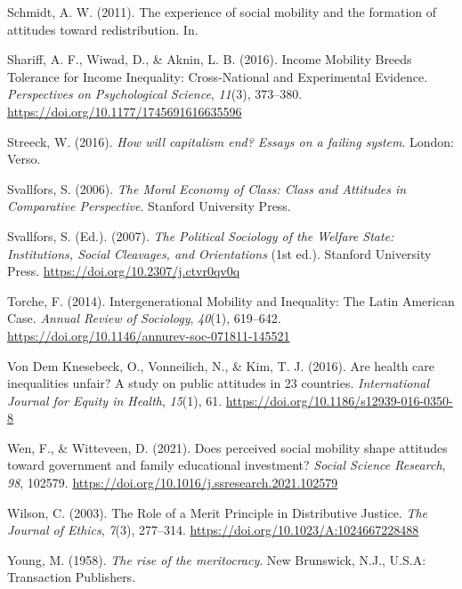 \documentclass[
  12pt,
]{article}
\newlength{\cslhangindent}
\newenvironment{CSLReferences}[2] %
 {\begin{list}{}{%
  \setlength{\itemindent}{0pt}
  \setlength{\leftmargin}{0pt}
  \setlength{\parsep}{0pt}
  \ifodd #1
   \setlength{\leftmargin}{\cslhangindent}
   \setlength{\itemindent}{-1\cslhangindent}
  \fi
  \setlength{\itemsep}{#2\baselineskip}}}
 {\end{list}}
\begin{document}
\begin{CSLReferences}{1}{0}
Schmidt, A. W. (2011). The experience of social mobility and the
formation of attitudes toward redistribution. In.

Shariff, A. F., Wiwad, D., \& Aknin, L. B. (2016). Income {Mobility
Breeds Tolerance} for {Income Inequality}: {Cross-National} and
{Experimental Evidence}. \emph{Perspectives on Psychological Science},
\emph{11}(3), 373--380. \url{https://doi.org/10.1177/1745691616635596}

Streeck, W. (2016). \emph{How will capitalism end? Essays on a failing
system}. London: Verso.

Svallfors, S. (2006). \emph{The {Moral Economy} of {Class}: {Class} and
{Attitudes} in {Comparative Perspective}}. Stanford University Press.

Svallfors, S. (Ed.). (2007). \emph{The {Political Sociology} of the
{Welfare State}: {Institutions}, {Social Cleavages}, and {Orientations}}
(1st ed.). Stanford University Press.
\url{https://doi.org/10.2307/j.ctvr0qv0q}

Torche, F. (2014). Intergenerational {Mobility} and {Inequality}: {The
Latin American Case}. \emph{Annual Review of Sociology}, \emph{40}(1),
619--642. \url{https://doi.org/10.1146/annurev-soc-071811-145521}

Von Dem Knesebeck, O., Vonneilich, N., \& Kim, T. J. (2016). Are health
care inequalities unfair? {A} study on public attitudes in 23 countries.
\emph{International Journal for Equity in Health}, \emph{15}(1), 61.
\url{https://doi.org/10.1186/s12939-016-0350-8}

Wen, F., \& Witteveen, D. (2021). Does perceived social mobility shape
attitudes toward government and family educational investment?
\emph{Social Science Research}, \emph{98}, 102579.
\url{https://doi.org/10.1016/j.ssresearch.2021.102579}

Wilson, C. (2003). The {Role} of a {Merit Principle} in {Distributive
Justice}. \emph{The Journal of Ethics}, \emph{7}(3), 277--314.
\url{https://doi.org/10.1023/A:1024667228488}

Young, M. (1958). \emph{The rise of the meritocracy}. New Brunswick,
N.J., U.S.A: Transaction Publishers.

\end{CSLReferences}
\end{document}
